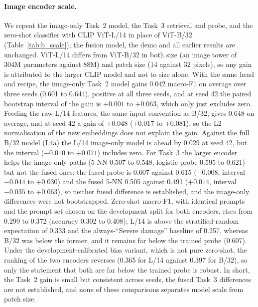 \paragraph{Image encoder scale.}
We repeat the image-only Task~2 model, the Task~3 retrieval and probe, and the zero-shot classifier with CLIP ViT-L/14 in place of ViT-B/32 (Table~\ref{tab:b_scale}); the fusion model, the demo and all earlier results are unchanged.
ViT-L/14 differs from ViT-B/32 in both size (an image tower of 304M parameters against 88M) and patch size (14 against 32 pixels), so any gain is attributed to the larger CLIP model and not to size alone.
With the same head and recipe, the image-only Task~2 model gains 0.042 macro-F1 on average over three seeds (0.601 to 0.644), positive at all three seeds, and at seed 42 the paired bootstrap interval of the gain is $+0.001$ to $+0.063$, which only just excludes zero.
Feeding the raw L/14 features, the same input convention as B/32, gives 0.648 on average, and at seed 42 a gain of $+0.048$ ($+0.017$ to $+0.081$), so the L2 normalisation of the new embeddings does not explain the gain.
Against the full B/32 model (L4a) the L/14 image-only model is ahead by 0.029 at seed 42, but the interval ($-0.010$ to $+0.071$) includes zero.
For Task~3 the larger encoder helps the image-only paths (5-NN 0.507 to 0.548, logistic probe 0.595 to 0.621) but not the fused ones: the fused probe is 0.607 against 0.615 ($-0.008$, interval $-0.044$ to $+0.030$) and the fused 5-NN 0.505 against 0.491 ($+0.014$, interval $-0.035$ to $+0.063$), so neither fused difference is established, and the image-only differences were not bootstrapped.
Zero-shot macro-F1, with identical prompts and the prompt set chosen on the development split for both encoders, rises from 0.299 to 0.372 (accuracy 0.302 to 0.408); L/14 is above the stratified-random expectation of 0.333 and the always-``Severe damage'' baseline of 0.257, whereas B/32 was below the former, and it remains far below the trained probe (0.607).
Under the development-calibrated bias variant, which is not pure zero-shot, the ranking of the two encoders reverses (0.365 for L/14 against 0.397 for B/32), so only the statement that both are far below the trained probe is robust.
In short, the Task~2 gain is small but consistent across seeds, the fused Task~3 differences are not established, and none of these comparisons separates model scale from patch size.
